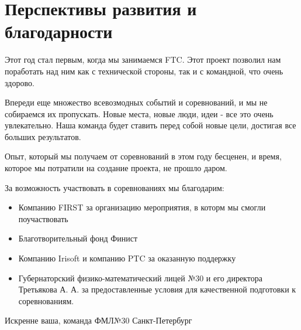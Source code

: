 \section{Перспективы развития и благодарности}

    Этот год стал первым, когда мы занимаемся FTC. Этот проект позволил нам поработать над ним как с технической стороны, так и с командной, что очень здорово.

    Впереди еще множество всевозмодных событий и соревнований, и мы не собираемся их пропускать. Новые места, новые люди, идеи - все это очень увлекательно. Наша команда будет ставить перед собой новые цели, достигая все больших результатов.

    Опыт, который мы получаем от соревнований в этом году бесценен, и время, которое мы потратили на создание проекта, не прошло даром.

    За возможность участвовать в соревнованиях мы благодарим:
	\begin{itemize}
		\item Компанию FIRST за организацию мероприятия, в которм мы смогли поучаствовать
		\item Благотворительный фонд Финист
		\item Компанию Irisoft и компанию PTC за оказанную поддержку
		\item Губернаторский физико-математический лицей №30 и его директора Третьякова А. А. за предоставленные условия для качественной подготовки к соревнованиям.
	\end{itemize}
   	
    \begin{center}
      Искренне ваша, команда ФМЛ№30 Санкт-Петербург
    \end{center}

